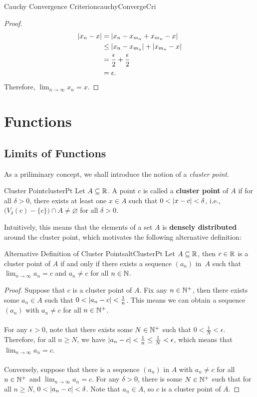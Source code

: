 \documentclass[math]{amznotes}
\theoremstyle{remark}
\begin{document}
\begin{thmbox}{Cauchy Convergence Criterion}{cauchyConvergeCri}
\begin{proof}
        \begin{align*}
            {\left\lvert {x_n - x} \right\rvert} & = {\left\lvert {x_n - x_{m_n} + x_{m_n} - x} \right\rvert} \\
            & \leq {\left\lvert {x_n - x_{m_n}} \right\rvert} + {\left\lvert {x_{m_n} - x} \right\rvert} \\
            & = \frac{\epsilon}{2} + \frac{\epsilon}{2} \\
            & = \epsilon.
        \end{align*}
        Therefore, $\lim_{n \to \infty}x_n = x$.
    \end{proof}
\end{thmbox}

\chapter{Functions}
\section{Limits of Functions}
As a priliminary concept, we shall introduce the notion of a \textit{cluster point}.
\begin{dfnbox}{Cluster Point}{clusterPt}
    Let $A \subseteq \mathbb{R}$. A point $c$ is called a {\color{red} \textbf{cluster point}} of $A$ if for all $\delta > 0$, there exists at least one $x \in A$ such that $0 < {\left\lvert {x - c} \right\rvert} < \delta$, i.e., $\bigl(V_\delta(c) - \{c\}\bigr) \cap A \neq \varnothing$ for all $\delta > 0$.
\end{dfnbox}
Intuitively, this means that the elements of a set $A$ is \textbf{densely distributed} around the cluster point, which motivates the following alternative definition:
\begin{thmbox}{Alternative Definition of Cluster Points}{altClusterPt}
    Let $A \subseteq \mathbb{R}$, then $c \in \mathbb{R}$ is a cluster point of $A$ if and only if there exists a sequence $(a_n)$ in~$A$ such that $\lim_{n \to \infty}a_n = c$ and $a_n \neq c$ for all $n \in \mathbb{N}$.
    \tcblower
    \begin{proof}
        Suppose that $c$ is a cluster point of $A$. Fix any $n \in \mathbb{N}^+$, then there exists some $a_n \in A$ such that $0 < {\left\lvert {a_n - c} \right\rvert} < \frac{1}{n}$. This means we can obtain a sequence $(a_n)$ with $a_n \neq c$ for all $n \in \mathbb{N}^+$.
        \\\\
        For any $\epsilon > 0$, note that there exists some $N \in \mathbb{N}^+$ such that $0 < \frac{1}{N} < \epsilon$. Therefore, for all $n \geq N$, we have ${\left\lvert {a_n - c} \right\rvert} < \frac{1}{n} \leq \frac{1}{N} < \epsilon$, which means that $\lim_{n \to \infty}a_n = c$.
        \\\\
        Conversely, suppose that there is a sequence $(a_n)$ in $A$ with $a_n \neq c$ for all $n \in \mathbb{N}^+$ and $\lim_{n \to \infty}a_n = c$. For any $\delta > 0$, there is some $N \in \mathbb{N}^+$ such that for all $n \geq N$, $0 < {\left\lvert {a_n - c} \right\rvert} < \delta$. Note that $a_n \in A$, so $c$ is a cluster point of $A$.
    \end{proof}
\end{thmbox}
\end{document}
